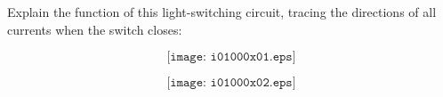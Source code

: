 

Explain the function of this light-switching circuit, tracing the directions of all currents when the switch closes:

$$\texttt{[image: i01000x01.eps]}$$







$$\texttt{[image: i01000x02.eps]}$$












